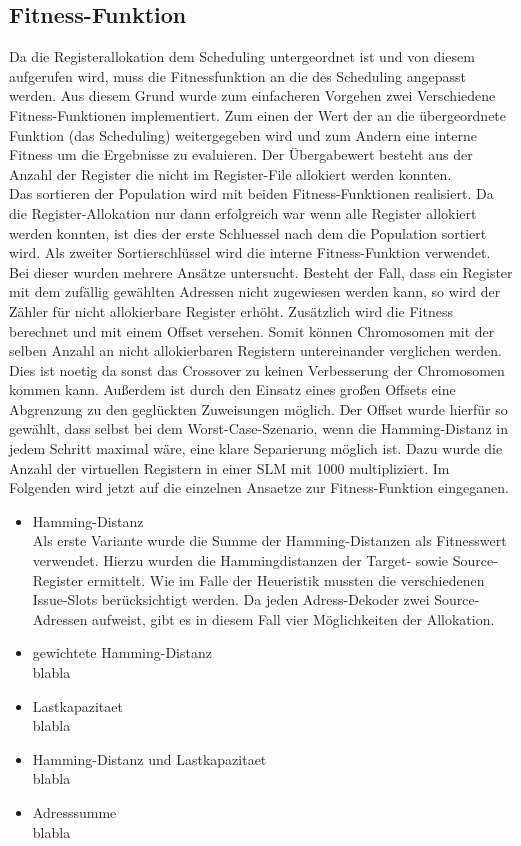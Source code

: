 \subsection{Fitness-Funktion}
\label{chap:Fitness-Funktion}
Da die Registerallokation dem Scheduling untergeordnet ist und von diesem aufgerufen wird, muss die Fitnessfunktion an die des Scheduling angepasst werden. Aus diesem Grund wurde zum einfacheren Vorgehen zwei Verschiedene Fitness-Funktionen implementiert. Zum einen der Wert der an die übergeordnete Funktion (das Scheduling) weitergegeben wird und zum Andern eine interne Fitness um die Ergebnisse zu evaluieren.
Der Übergabewert besteht aus der Anzahl der Register die nicht im Register-File allokiert werden konnten.\\
Das sortieren der Population wird mit beiden Fitness-Funktionen realisiert. Da die Register-Allokation nur dann erfolgreich war wenn alle Register allokiert werden konnten, ist dies der erste Schluessel nach dem die Population sortiert wird. Als zweiter Sortierschlüssel wird die interne Fitness-Funktion verwendet. Bei dieser wurden mehrere Ansätze untersucht.
Besteht der Fall, dass ein Register mit dem zufällig gewählten Adressen nicht zugewiesen werden kann, so wird der Zähler für nicht allokierbare Register erhöht. Zusätzlich wird die Fitness berechnet und mit einem Offset versehen. Somit können Chromosomen mit der selben Anzahl an nicht allokierbaren Registern untereinander verglichen werden. Dies ist noetig da sonst das Crossover zu keinen Verbesserung der Chromosomen kommen kann. Außerdem ist durch den Einsatz eines großen Offsets eine Abgrenzung zu den geglückten Zuweisungen möglich. Der Offset wurde hierfür  so gewählt, dass selbst bei dem Worst-Case-Szenario, wenn die Hamming-Distanz in jedem Schritt maximal wäre, eine klare Separierung möglich ist. Dazu wurde die Anzahl der virtuellen Registern in einer SLM mit 1000 multipliziert.
Im Folgenden wird jetzt auf die einzelnen Ansaetze zur Fitness-Funktion eingeganen.
\begin{itemize}
	\item Hamming-Distanz\\
		Als erste Variante wurde die Summe der Hamming-Distanzen als Fitnesswert verwendet. Hierzu wurden die Hammingdistanzen der Target- sowie Source-Register ermittelt. Wie im Falle der Heueristik mussten die verschiedenen Issue-Slots berücksichtigt werden. Da jeden Adress-Dekoder zwei Source-Adressen aufweist, gibt es in diesem Fall vier Möglichkeiten der Allokation.
	\item gewichtete Hamming-Distanz\\
		blabla
	\item Lastkapazitaet\\
		blabla
	\item Hamming-Distanz und Lastkapazitaet\\
		blabla
	\item Adresssumme\\
		blabla
\end{itemize}
 
